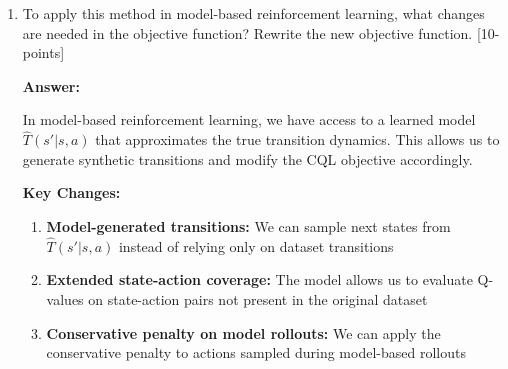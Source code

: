 \documentclass[12pt]{article}
\begin{document}
{{\begin{enumerate}
    \textbf{Step 3:} Solve for $\mu(a|s)$:
    \begin{align}
    \mu^*(a|s) &= \exp(\alpha Q(s,a) - 1 + \lambda)
    \end{align}
    
    \textbf{Step 4:} Use the constraint $\sum_a \mu(a|s) = 1$ to find $\lambda$:
    \begin{align}
    \sum_a \exp(\alpha Q(s,a) - 1 + \lambda) &= 1 \\
    \exp(-1 + \lambda) \sum_a \exp(\alpha Q(s,a)) &= 1 \\
    \exp(-1 + \lambda) &= \frac{1}{\sum_a \exp(\alpha Q(s,a))}
    \end{align}
    
    \textbf{Step 5:} Substitute back to get the optimal distribution:
    \begin{align}
    \mu^*(a|s) &= \frac{\exp(\alpha Q(s,a))}{\sum_{a'} \exp(\alpha Q(s,a'))}
    \end{align}
    
    \textbf{Step 6:} Substitute $\mu^*$ back into the original objective to get the minimization-only form:
    \begin{align}
    \hat{Q}^T &= \arg \min_{Q} \alpha \mathbb{E}_{s \sim D} \left[ \log \sum_a \exp(Q(s,a)) - \mathbb{E}_{a \sim \hat{\pi}_{\beta}(a|s)} [Q(s,a)] \right] \\
    &\quad + \mathbb{E}_{(s,a,s') \sim D} \left[ (Q(s,a) - (r(s,a) + \mathbb{E}[Q(s',a')]))^2 \right]
    \end{align}
    
    This is the \textbf{CQL($\mathcal{H}$)} objective, which is a pure minimization problem that learns conservative Q-values by penalizing the log-sum-exp of Q-values while rewarding Q-values for dataset actions.

    \item To apply this method in model-based reinforcement learning, what changes are needed in the objective function? Rewrite the new objective function. [10-points]
    
    \textbf{Answer:}
    
    In model-based reinforcement learning, we have access to a learned model $\hat{T}(s'|s,a)$ that approximates the true transition dynamics. This allows us to generate synthetic transitions and modify the CQL objective accordingly.
    
    \textbf{Key Changes:}
    \begin{enumerate}
        \item \textbf{Model-generated transitions:} We can sample next states from $\hat{T}(s'|s,a)$ instead of relying only on dataset transitions
        \item \textbf{Extended state-action coverage:} The model allows us to evaluate Q-values on state-action pairs not present in the original dataset
        \item \textbf{Conservative penalty on model rollouts:} We can apply the conservative penalty to actions sampled during model-based rollouts
    \end{enumerate}
    

\end{enumerate}}}
\end{document}
